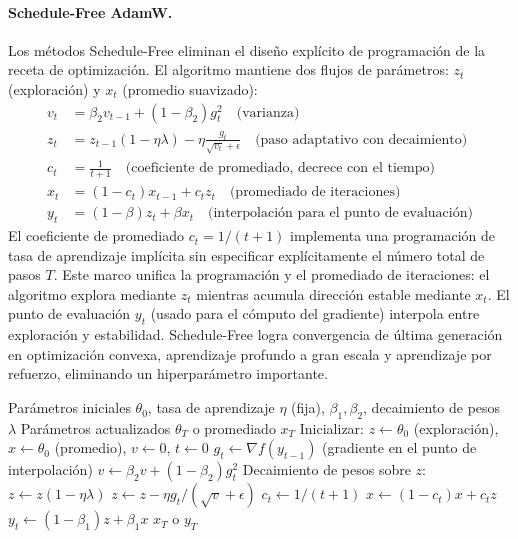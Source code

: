 \documentclass[11pt,a4paper]{article}
\begin{document}
\paragraph{Schedule-Free AdamW.}
Los métodos Schedule-Free eliminan el diseño explícito de programación de la receta de optimización. El algoritmo mantiene dos flujos de parámetros: $z_t$ (exploración) y $x_t$ (promedio suavizado):
\begin{align}
v_t &= \beta_2 v_{t-1} + (1-\beta_2)g_t^2 \quad\text{(varianza)} \\
z_t &= z_{t-1}(1-\eta\lambda) - \eta\frac{g_t}{\sqrt{v_t}+\epsilon} \quad\text{(paso adaptativo con decaimiento)} \\
c_t &= \frac{1}{t+1} \quad\text{(coeficiente de promediado, decrece con el tiempo)} \\
x_t &= (1-c_t)x_{t-1} + c_t z_t \quad\text{(promediado de iteraciones)} \\
y_t &= (1-\beta)z_t + \beta x_t \quad\text{(interpolación para el punto de evaluación)}
\end{align}
El coeficiente de promediado $c_t = 1/(t+1)$ implementa una programación de tasa de aprendizaje implícita sin especificar explícitamente el número total de pasos $T$. Este marco unifica la programación y el promediado de iteraciones: el algoritmo explora mediante $z_t$ mientras acumula dirección estable mediante $x_t$. El punto de evaluación $y_t$ (usado para el cómputo del gradiente) interpola entre exploración y estabilidad. Schedule-Free logra convergencia de última generación en optimización convexa, aprendizaje profundo a gran escala y aprendizaje por refuerzo, eliminando un hiperparámetro importante.

\begin{algorithm}[H]
\caption{Schedule-Free AdamW}
\label{alg:schedulefree}
\begin{algorithmic}[1]
\Require Parámetros iniciales $\theta_0$, tasa de aprendizaje $\eta$ (fija), $\beta_1, \beta_2$, decaimiento de pesos $\lambda$
\Ensure Parámetros actualizados $\theta_T$ o promediado $x_T$
\State Inicializar: $z \gets \theta_0$ (exploración), $x \gets \theta_0$ (promedio), $v \gets 0$, $t \gets 0$
    \State $g_t \gets \nabla f(y_{t-1})$ (gradiente en el punto de interpolación)
    \State $v \gets \beta_2 v + (1-\beta_2) g_t^2$ 
    \State Decaimiento de pesos sobre $z$: $z \gets z(1 - \eta\lambda)$
    \State $z \gets z - \eta g_t / (\sqrt{v} + \epsilon)$ 
    \State $c_t \gets 1 / (t+1)$ 
    \State $x \gets (1-c_t) x + c_t z$ 
    \State $y_t \gets (1-\beta_1) z + \beta_1 x$ 
\EndFor
\Return $x_T$ o $y_T$
\end{algorithmic}
\end{algorithm}
\end{document}
